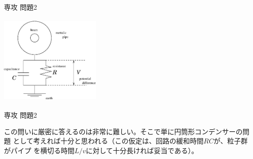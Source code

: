 \documentclass[fleqn]{jbook}
\begin{document}
\begin{question}{専攻 問題2}{}
\begin{center}
\vspace{5mm}
\includegraphics[clip,height=45mm,width=50mm]{1992phy2-1-2.eps}
\end{center}

\end{question}
\begin{answer}{専攻 問題2}{}
\begin{subanswers}

\SubAnswer
\parbox[t]{85mm}{
この問いに厳密に答えるのは非常に難しい。そこで単に円筒形コンデンサーの問題
として考えれば十分と思われる（この仮定は、回路の緩和時間$RC$が、粒子群がパイプ
を横切る時間$L/v$に対して十分長ければ妥当である）。

}
\end{subanswers}
\end{answer}
\end{document}
